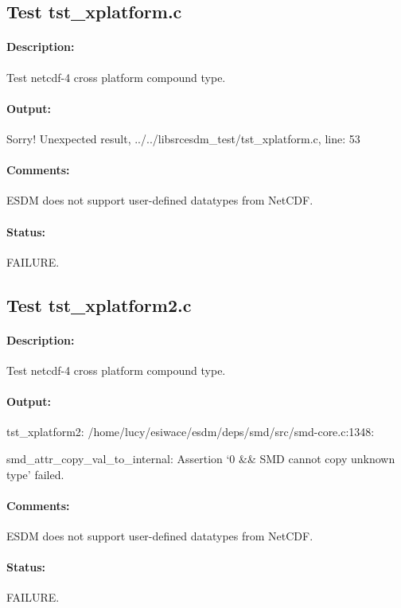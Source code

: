 \subsection{Test tst\_xplatform.c}

\paragraph{Description:} Test netcdf-4 cross platform compound type.

\paragraph{Output:} Sorry! Unexpected result, ../../libsrcesdm\_test/tst\_xplatform.c, line: 53

\paragraph{Comments:} ESDM does not support user-defined datatypes from NetCDF.

\paragraph{Status:} FAILURE.

\subsection{Test tst\_xplatform2.c}

\paragraph{Description:} Test netcdf-4 cross platform compound type.

\paragraph{Output:} tst\_xplatform2: /home/lucy/esiwace/esdm/deps/smd/src/smd-core.c:1348:

smd\_attr\_copy\_val\_to\_internal: Assertion `0 \&\& SMD cannot copy unknown type' failed.

\paragraph{Comments:} ESDM does not support user-defined datatypes from NetCDF.

\paragraph{Status:} FAILURE.

